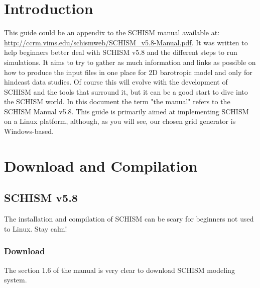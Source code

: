 \documentclass[preprints,briefreport,accept,oneauthor,pdftex]{Definitions/mdpi}
\begin{document}
\tableofcontents
\clearpage

\section{Introduction}
This guide could be an appendix to the SCHISM manual available at: \url{http://ccrm.vims.edu/schismweb/SCHISM_v5.8-Manual.pdf}. It was written to help beginners better deal with SCHISM v5.8 and the different steps to run simulations. It aims to try to gather as much information and links as possible on how to produce the input files in one place for 2D barotropic model and only for hindcast data studies. Of course this will evolve with the development of SCHISM and the tools that surround it, but it can be a good start to dive into the SCHISM world. In this document the term "the manual" refers to the SCHISM Manual v5.8. This guide is primarily aimed at implementing SCHISM on a Linux platform, although, as you will see, our chosen grid generator is Windows-based.
 
\section{Download and Compilation}
\subsection{SCHISM v5.8}
The installation and compilation of SCHISM can be scary for beginners not used to Linux. Stay calm! 
\subsubsection{Download}
The section 1.6 of the manual is very clear to download SCHISM modeling system.
\end{document}
